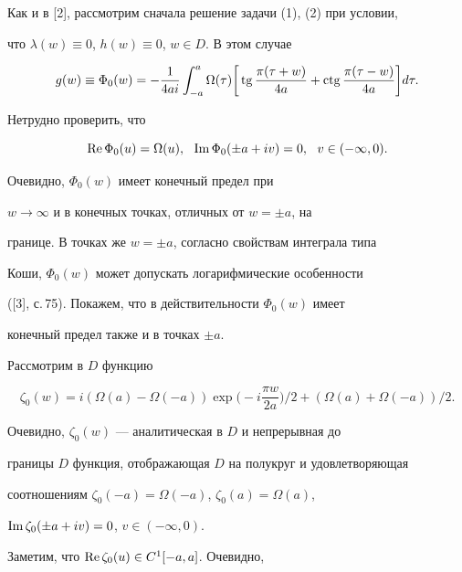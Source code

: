 \begin{pf}


Как и в [2], рассмотрим сначала решение задачи (1), (2) при условии,


что $\lambda(w) \equiv 0$, $h(w) \equiv 0$, $w \in D$. В этом случае


\begin{equation}


g(w) \equiv \Phi_0(w)


= - \frac{1}{4 a i} \int_{-a}^{a} \Omega(\tau)


\bigg[\tg\frac{\pi(\tau + w)}{4 a} + \ctg\frac{\pi(\tau-w)}{4 a}\bigg] d\tau.


\end{equation}


Нетрудно проверить, что


$$


\re \Phi_0(u) = \Omega(u),\ \ \im \Phi_0(\pm a + iv) = 0,\ \ v \in


(-\infty, 0).


$$


Очевидно, $\Phi_0(w)$ имеет конечный предел при


$w \to \infty$ и в конечных точках, отличных от $w = \pm a$, на


границе. В точках же $w = \pm a$, согласно свойствам интеграла типа


Коши, $\Phi_0(w)$ может допускать логарифмические особенности


([3], с.\,75). Покажем, что в действительности $\Phi_0(w)$ имеет


конечный предел также и в точках $\pm a$.





Рассмотрим в $D$ функцию


$$


\zeta_0 (w)=i(\Omega(a)-\Omega(-a)) \exp \bigg(-i\frac{\pi w}{2a}\bigg)/2 +


(\Omega(a) + \Omega(-a))/2.


$$


Очевидно, $\zeta_0(w)$ --- аналитическая в $D$ и непрерывная до


границы $D$ функция, отображающая $D$ на полукруг и удовлетворяющая


соотношениям $\zeta_0(-a) = \Omega(-a)$, $\zeta_0(a) = \Omega(a)$,


$\operatorname{Im} \zeta_0 (\pm a + iv) = 0$, $v \in (-\infty,0)$.


Заметим, что $\operatorname{Re} \zeta_0(u) \in C^1[-a,a]$. Очевидно,



\end{pf}
